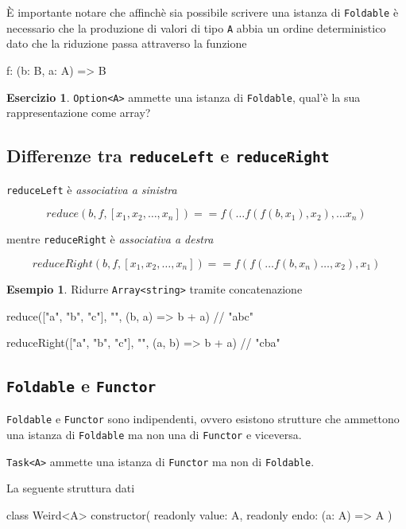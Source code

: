 \documentclass[12pt]{article}
\theoremstyle{definition}
\newtheorem{example}{Esempio}[section]
\newtheorem{exercise}{Esercizio}[section]
\newenvironment{code}
  {\vspace{0.5cm} \VerbatimEnvironment\begin{typescriptcode}}
  {\end{typescriptcode} \vspace{0.2cm}}
\begin{document}
È importante notare che affinchè sia possibile scrivere una istanza di \texttt{Foldable} è necessario che la produzione di valori
di tipo \texttt{A} abbia un ordine deterministico dato che la riduzione passa attraverso la funzione

\begin{code}
f: (b: B, a: A) => B
\end{code}

\begin{exercise}
\texttt{Option<A>} ammette una istanza di \texttt{Foldable}, qual'è la sua rappresentazione come array?
\end{exercise}

\subsection{Differenze tra \texttt{reduceLeft} e \texttt{reduceRight}}

\texttt{reduceLeft} è \emph{associativa a sinistra}

$$
reduce(b, f, [x_1, x_2, \ldots , x_n])  == f( \ldots f(f(b, x_1), x_2), \ldots x_n)
$$

mentre \texttt{reduceRight} è \emph{associativa a destra}

$$
reduceRight(b, f, [x_1, x_2, \ldots , x_n])  == f(f( \ldots f(b, x_n) \ldots , x_2), x_1)
$$

\begin{example}
Ridurre \texttt{Array<string>} tramite concatenazione

\begin{code}
reduce(["a", "b", "c"], "", (b, a) => b + a) // "abc"

reduceRight(["a", "b", "c"], "", (a, b) => b + a) // "cba"
\end{code}
\end{example}

\subsection{\texttt{Foldable} e \texttt{Functor}}

\texttt{Foldable} e \texttt{Functor} sono indipendenti, ovvero esistono strutture che ammettono una istanza di \texttt{Foldable} ma non una di
\texttt{Functor} e viceversa.

\texttt{Task<A>} ammette una istanza di \texttt{Functor} ma non di \texttt{Foldable}.

La seguente struttura dati

\begin{code}
class Weird<A> {
  constructor(
    readonly value: A,
    readonly endo: (a: A) => A
  ) {}
}
\end{code}
\end{document}
